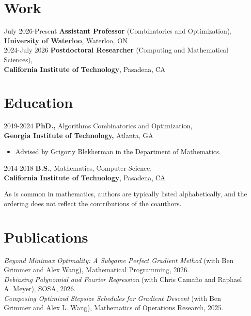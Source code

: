\documentclass[margin]{res}
\begin{document}
 
 

\begin{resume} 
\section{Work}
July 2026-{\small Present} {\bf Assistant Professor} (Combinatorics and Optimization),\\ {\bf University of Waterloo}, Waterloo, ON\\

2024-July 2026 {\bf Postdoctoral Researcher} (Computing and Mathematical Sciences),\\ {\bf California Institute of Technology}, Pasadena, CA

\section{Education} 
2019-2024 {\bf PhD.,} Algorithms Combinatorics and Optimization,\\ {\bf Georgia Institute of Technology,} Atlanta, GA
 
 \begin{itemize} \itemsep -2pt  %
 \item Advised by Grigoriy Blekherman in the Department of Mathematics.
 \end{itemize}

2014-2018 {\bf B.S.}, Mathematics, Computer Science,\\ {\bf California Institute of Technology}, Pasadena, CA

{As is common in mathematics, authors are typically listed alphabetically, and the ordering does not reflect the contributions of the coauthors.}
\section{Publications}
\emph{Beyond Minimax Optimality: A Subgame Perfect Gradient Method} (with Ben Grimmer and Alex Wang), Mathematical Programming, 2026.\\

\emph{Debiasing Polynomial and Fourier Regression} (with Chris Camaño and Raphael A. Meyer), SOSA, 2026.\\

\emph{Composing Optimized Stepsize Schedules for Gradient Descent} (with Ben Grimmer and Alex L. Wang), Mathematics of Operations Research, 2025.\\


\end{resume}
\end{document}
